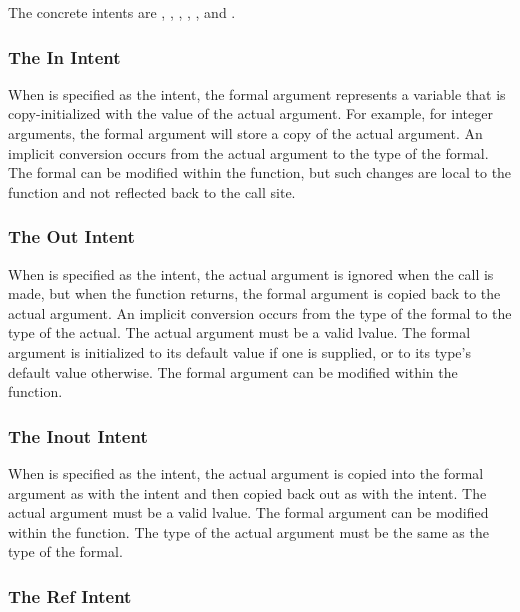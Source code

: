The concrete intents are , , ,
, , and .

\subsubsection{The In Intent}
\label{The_In_Intent}

When  is specified as the intent, the formal argument
represents a variable that is copy-initialized with the value of the
actual argument. For example, for integer arguments, the formal
argument will store a copy of the actual argument.
An implicit conversion occurs from the actual argument
to the type of the formal.  The
formal can be modified within the function, but such changes are local
to the function and not reflected back to the call site.


\subsubsection{The Out Intent}
\label{The_Out_Intent}

When  is specified as the intent, the actual argument is
ignored when the call is made, but when the function returns, the
formal argument is copied back to the actual argument.
An implicit conversion occurs from the type of the formal
to the type of the actual.  The actual argument
must be a valid lvalue.  The formal
argument is initialized to its default value if one is supplied, or to
its type's default value otherwise.  The formal argument can be
modified within the function.


\subsubsection{The Inout Intent}
\label{The_Inout_Intent}

When  is specified as the intent, the actual argument is
copied into the formal argument as with the  intent and then
copied back out as with the  intent.  The actual argument
must be a valid lvalue.  The formal argument can be modified within
the function.
The type of the actual argument must be the same
as the type of the formal.


\subsubsection{The Ref Intent}
\label{The_Ref_Intent}


